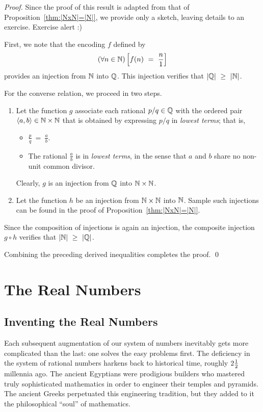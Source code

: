 \begin{proof}
Since the proof of this result is adapted from that of
Proposition~\ref{thm:|NxN|=|N|}, we provide only a sketch, leaving
details to an exercise.  {\Arny Exercise alert :)}

First, we note that the encoding $f$ defined by
\[ (\forall n \in \N) \left[ f(n) \ = \ \frac{n}{1} \right] \]
provides an injection from $\mathbb{N}$ into $\mathbb{Q}$.  This injection verifies
that $|\mathbb{Q}| \ \geq \ |\mathbb{N}|$.

For the converse relation, we proceed in two steps.
\begin{enumerate}
\item
Let the function $g$ associate each rational $p/q \in \mathbb{Q}$ with the
ordered pair $\langle a, b \rangle \in \mathbb{N} \times \mathbb{N}$ that is obtained
by expressing $p/q$ in {\em lowest terms}; that is,
  \begin{itemize}
  \item
$\displaystyle \frac{p}{q} \ = \ \frac{a}{b}$.
  \item
The rational $\displaystyle \frac{a}{b}$ is in {\em lowest terms}, in
the sense that $a$ and $b$ share no non-unit common divisor.
  \end{itemize}
Clearly, $g$ is an injection from $\mathbb{Q}$ into $\mathbb{N} \times \mathbb{N}$.

\item
Let the function $h$ be an injection from $\mathbb{N} \times \mathbb{N}$ into $\mathbb{N}$.
Sample such injections can be found in the proof of
Proposition~\ref{thm:|NxN|=|N|}.
\end{enumerate}
Since the composition of injections is again an injection, the
composite injection $g \circ h$ verifies
that $|\mathbb{N}| \ \geq \ |\mathbb{Q}|$.

Combining the preceding derived inequalities completes the proof.
\qed
\end{proof}


\section{The Real Numbers}
\label{sec:reals}

\subsection{Inventing the Real Numbers}
\label{sec:real-history}

Each subsequent augmentation of our system of numbers inevitably gets
more complicated than the last: one solves the easy problems first.
The deficiency in the system of rational numbers harkens back to
historical time, roughly $2 {1 \over 2}$ millennia ago.  The ancient
Egyptians were prodigious builders who mastered truly sophisticated
mathematics in order to engineer their temples and pyramids.  The
ancient Greeks perpetuated this engineering tradition, but they added
to it the philosophical ``soul'' of mathematics.

